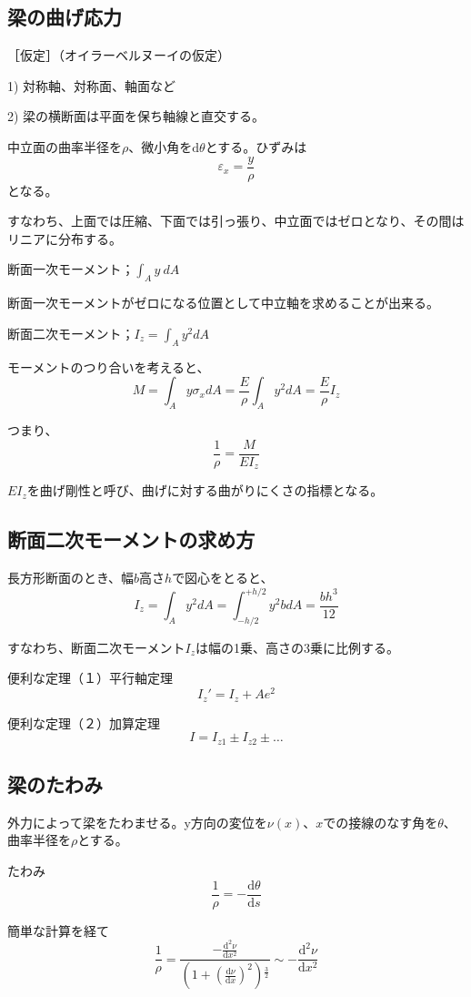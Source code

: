 \documentclass[a4j,10pt,oneside,openany]{jsbook}
\newcommand{\derivative}[2]{\frac{\mathrm{d} #1}{\mathrm{d} #2}}
\newcommand{\dderivative}[2]{\frac{\mathrm{d}^2 #1}{\mathrm{d} {#2}^2}}
\begin{document}
\subsection{梁の曲げ応力}
［仮定］（オイラーベルヌーイの仮定）

1) 対称軸、対称面、軸面など

2) 梁の横断面は平面を保ち軸線と直交する。
\newline

中立面の曲率半径を$\rho$、微小角を$\mathrm{d}\theta$とする。ひずみは
\[\varepsilon_x = \frac{y}{\rho}\]
となる。

すなわち、上面では圧縮、下面では引っ張り、中立面ではゼロとなり、その間はリニアに分布する。

断面一次モーメント；$\int_A y\ dA$

断面一次モーメントがゼロになる位置として中立軸を求めることが出来る。

断面二次モーメント；$I_z = \int_A y^2 dA$

モーメントのつり合いを考えると、\[M = \int_A y\sigma_x dA = \frac{E}{\rho} \int_A y^2 dA = \frac{E}{\rho} I_z\]

つまり、\[\frac{1}{\rho} = \frac{M}{EI_z}\]

$EI_z$を曲げ剛性と呼び、曲げに対する曲がりにくさの指標となる。


\subsection{断面二次モーメントの求め方}
長方形断面のとき、幅$b$高さ$h$で図心をとると、
\[ I_z = \int_A y^2 dA = \int_{-h/2}^{+h/2} y^2 b dA = \frac{bh^3}{12}\]

すなわち、断面二次モーメント$I_z$は幅の1乗、高さの3乗に比例する。
\newline

便利な定理（１）平行軸定理
\[I_z' = I_z + Ae^2 \]

便利な定理（２）加算定理
\[I = I_{z1} \pm I_{z2} \pm \hdots \]

\subsection{梁のたわみ}

外力によって梁をたわませる。y方向の変位を$\nu(x)$、$x$での接線のなす角を$\theta$、曲率半径を$\rho $とする。

たわみ
\[\frac{1}{\rho} = - \derivative{\theta}{s}\]

簡単な計算を経て
\[\frac{1}{\rho} = \frac{-\dderivative{\nu}{x}}{\left( 1 + (\derivative{\nu}{x} )^2 \right) {}^{\frac{3}{2}}} \sim -\dderivative{\nu}{x}\]
\end{document}
